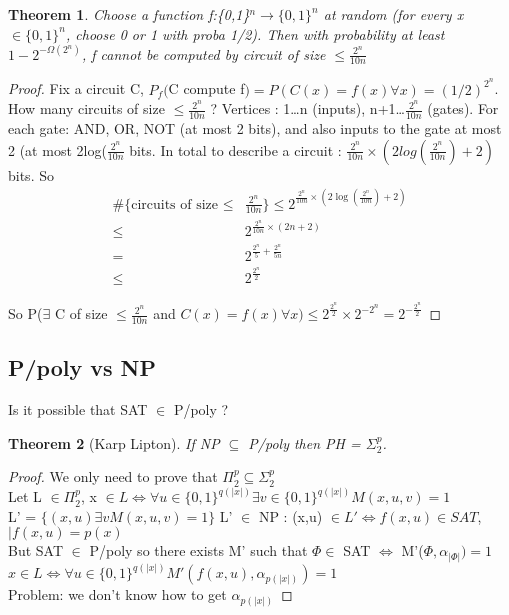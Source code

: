 \documentclass{article}
\newtheorem{theorem}{Theorem}
\theoremstyle{definition}
\theoremstyle{remark}
\begin{document}
\begin{theorem}
	Choose a function f:\{0,1\}$^n \rightarrow\{0,1\}^n$ at random (for every x $\in\{0,1\}^n$, choose 0 or 1 with proba 1/2). Then with probability at least $1 - 2^{-\Omega(2^n)}$, f cannot be computed by circuit of size $\leq \frac{2^n}{10n}$
\end{theorem}
\begin{proof}
	Fix a circuit C, $P_f($C compute f$) = P(C(x) = f(x) \forall x) = (1/2)^{2^n}$. How many circuits of size $\leq \frac{2^n}{10n}$ ?
	Vertices : 1\dots n (inputs), n+1\dots$\frac{2^n}{10n}$ (gates).
	For each gate: AND, OR, NOT (at most 2 bits), and also inputs to the gate at most 2 (at most 2log($\frac{2^n}{10n}$ bits.
	In total to describe a circuit : $\frac{2^n}{10n}\times(2 log(\frac{2^n}{10n}) + 2)$ bits.
	So \begin{align*}
	\text{\#\{circuits of size }\leq & \frac{2^n}{10n}\} \leq 2^{\frac{2^n}{10n}\times(2 \log(\frac{2^n}{10n}) + 2)}\\
	\leq & 2^{\frac{2^n}{10n}\times(2 n + 2)}\\
	= & 2^{\frac{2^n}{5} + \frac{2^n}{5n}}\\
	\leq & 2^{\frac{2^n}{2}}
	\end{align*}
	
So P($\exists$ C of size $\leq \frac{2^n}{10n}$ and $C(x) = f(x) \forall x) \leq 2^{\frac{2^n}{2}}\times 2^{-2^n} = 2^{-\frac{2^n}{2}}$
\end{proof}

\subsection{P/poly vs NP}
Is it possible that SAT $\in$ P/poly ?
\begin{theorem}[Karp Lipton]
	If NP $\subseteq$ P/poly then PH = $\Sigma^p_2$.
\end{theorem}

\begin{proof}
	We only need to prove that $\Pi_2^p \subseteq \Sigma_2^p$\\
	Let L $\in \Pi_2^p$, x $\in L \Leftrightarrow \forall u\in\{0,1\}^{q(|x|)}\exists v\in\{0,1\}^{q(|x|)} M(x,u,v) = 1$\\
	L' = $\{(x,u) \exists v M(x,u,v) = 1\}$
	L' $\in$ NP : (x,u) $\in L' \Leftrightarrow f(x,u) \in SAT$, $|f(x,u) = p(x)$\\
	But SAT $\in$ P/poly so there exists M' such that $\Phi \in$ SAT $\Leftrightarrow$ M'($\Phi,\alpha_{|\Phi|}) = 1$\\
	$x \in L \Leftrightarrow \forall u\in\{0,1\}^{q(|x|)} M'(f(x,u),\alpha_{p(|x|)}) = 1$\\
	
	Problem: we don't know how to get $\alpha_{p(|x|)}$
\end{proof}
\end{document}
